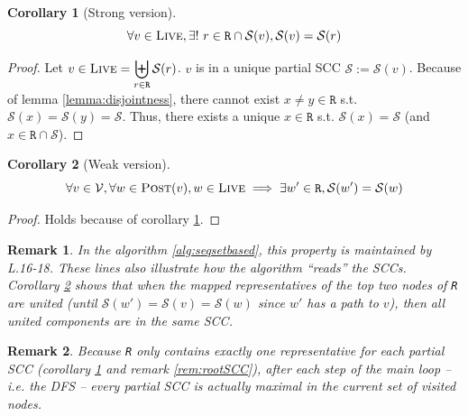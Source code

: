 \documentclass[a4 paper, 12pt]{article}
\newtheorem{corollary}{Corollary}[lemma]
\newtheorem{remark}{Remark}
\begin{document}
\begin{corollary}[Strong version]\label{cor:cor1}
    \begin{equation*}
        \forall v \in \textsc{Live}, \exists!~r \in \texttt{R} \cap \mathcal{S}(v), \mathcal{S}(v) = \mathcal{S}(r)
    \end{equation*}
\end{corollary}
\begin{proof}
    Let $v \in \textsc{Live} = \displaystyle{\biguplus_{r \in \texttt{R}} \mathcal{S}(r)}$. $v$ is in a unique partial SCC $\mathscr{S} := \mathcal{S}(v)$. Because of lemma \ref{lemma:disjointness}, there cannot exist $x \neq y \in \texttt{R}$ s.t. $\mathcal{S}(x) = \mathcal{S}(y) = \mathscr{S}$. Thus, there exists a unique $x \in \texttt{R}$ s.t. $\mathcal{S}(x) = \mathscr{S}$ (and $x\in \texttt{R} \cap \mathscr{S}$).
\end{proof}

\begin{corollary}[Weak version]\label{cor:cor2}
    \begin{equation*}
        \forall v \in \mathcal{V}, \forall w \in \textsc{Post}(v), w \in \textsc{Live} \implies \exists w' \in \texttt{R}, \mathcal{S}(w') = \mathcal{S}(w)
    \end{equation*}
\end{corollary}

\begin{proof}
    Holds because of corollary \ref{cor:cor1}.
\end{proof}

\begin{remark}
    In the algorithm \ref{alg:seqsetbased}, this property is maintained by L.16-18. These lines also illustrate how the algorithm ``reads'' the SCCs. Corollary \ref{cor:cor2} shows that when the mapped representatives of the top two nodes of \texttt{R} are united (until $\mathcal{S}(w') = \mathcal{S}(v) = \mathcal{S}(w)$ since $w'$ has a path to $v$), then all united components are in the same SCC.
\end{remark}

\begin{remark}\label{rem:proof}
    Because \texttt{R} only contains exactly one representative for each partial SCC (corollary \ref{cor:cor1} and remark \ref{rem:rootSCC}), after each step of the main loop -- \textit{i.e.} the DFS -- every partial SCC is actually maximal in the current set of visited nodes.
\end{remark}
\end{document}
